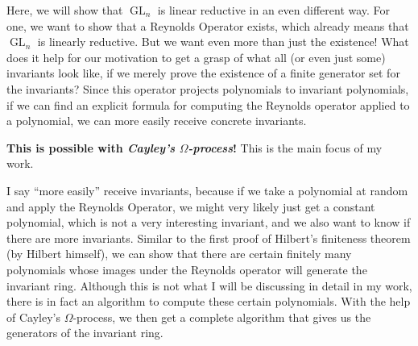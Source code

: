 Here, we will show that $\operatorname{GL}_n$ is linear reductive in an even different way.
For one, we want to show that a Reynolds Operator exists, which already means that $\operatorname{GL}_n$ is linearly reductive.
But we want even more than just the existence!
What does it help for our motivation to get a grasp of what all (or even just some) invariants look like, if we merely prove the existence of a finite generator set for the invariants?
Since this operator projects polynomials to invariant polynomials, if we can find an explicit formula for computing the Reynolds operator applied to a polynomial, we can more easily receive concrete invariants.

\textbf{This is possible with \textit{Cayley's $\Omega$-process}!}
This is the main focus of my work.

I say ``more easily'' receive invariants, because if we take a polynomial at random and apply the Reynolds Operator, we might very likely just get a constant polynomial, which is not a very interesting invariant, and we also want to know if there are more invariants.
Similar to the first proof of Hilbert's finiteness theorem (by Hilbert himself), we can show that there are certain finitely many polynomials whose images under the Reynolds operator will generate the invariant ring.
Although this is not what I will be discussing in detail in my work, there is in fact an algorithm to compute these certain polynomials.
With the help of Cayley's $\Omega$-process, we then get a complete algorithm that gives us the generators of the invariant ring.

